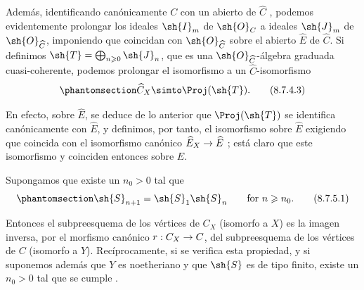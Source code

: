 \documentclass[oneside,10pt]{amsart}
\makeatletter
\renewcommand{\geq}{\geqslant}
\newcommand{\ega@arrow}[2]{\mathchoice{#1}{#2}{#2}{#2}}
\renewcommand{\to}{\ega@arrow{\longrightarrow}{\rightarrow}}
\let\EGAOriginalLabel\label
\renewcommand{\label}[1]{\phantomsection\EGAOriginalLabel{#1}}
\makeatother
\begin{document}
\begin{remark}[8.7.4]
\begin{enumerate}
    Además, identificando canónicamente $C$ con un abierto de $\widehat{C}$ , podemos evidentemente prolongar los ideales $\sh{I}_m$ de $\sh{O}_C$ a ideales $\sh{J}_m$ de $\sh{O}_{\widehat{C}}$, imponiendo que coincidan con $\sh{O}_{\widehat{C}}$ sobre el abierto $\widehat{E}$ de $\widehat{C}$.
    Si definimos $\sh{T}=\bigoplus_{n\geq 0}\sh{J}_n$, que es una $\sh{O}_{\widehat{C}}$-álgebra graduada cuasi-coherente, podemos prolongar el isomorfismo  a un $\widehat{C}$-isomorfismo
    \[
    \label{II.8.7.4.3}
      \widehat{C}_X \simto \Proj(\sh{T}).
    \tag{8.7.4.3}
    \]

    En efecto, sobre $\widehat{E}$, se deduce de lo anterior que $\Proj(\sh{T})$ se identifica canónicamente con $\widehat{E}$, y definimos, por tanto, el isomorfismo  sobre $\widehat{E}$ exigiendo que coincida con el isomorfismo canónico $\widehat{E}_X\to\widehat{E}$ ;
    está claro que este isomorfismo y  coinciden entonces sobre $E$.
\end{enumerate}
\end{remark}
\begin{corollary}[8.7.5]
\label{II.8.7.5}
Supongamos que existe un $n_0>0$ tal que
\[
\label{II.8.7.5.1}
  \sh{S}_{n+1} = \sh{S}_1\sh{S}_n
  \qquad
  \text{for }n\geq n_0.
\tag{8.7.5.1}
\]

Entonces el subpreesquema de los vértices de $C_X$ (isomorfo a $X$) es la imagen inversa, por el morfismo canónico $r:C_X\to C$, del subpreesquema de los vértices de $C$ (isomorfo a $Y$).
Recíprocamente, si se verifica esta propiedad, y si suponemos además que $Y$ es noetheriano y que $\sh{S}$ es de tipo finito, existe un $n_0>0$ tal que se cumple .
\end{corollary}
\end{document}
